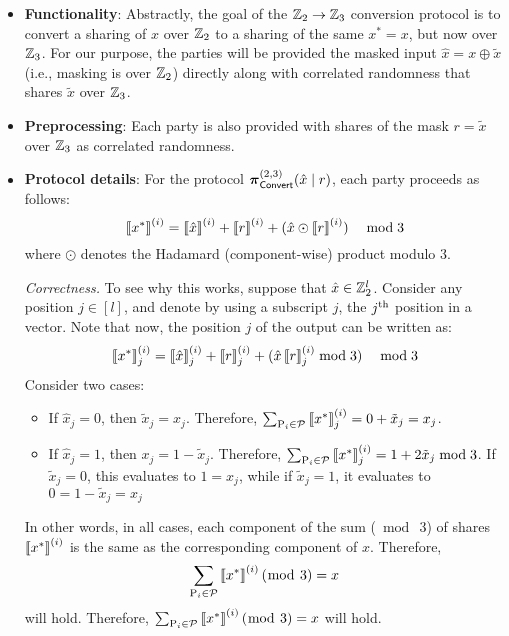 \begin{itemize}
  \item \textbf{Functionality}: Abstractly, the goal of the $\mathbb{Z}_2 \to \mathbb{Z}_3$ conversion protocol is to convert a sharing of $x$ over $\mathbb{Z}_2$ to a sharing of the same $x^* = x$, but now over $\mathbb{Z}_3$. For our purpose, the parties will be provided the masked input $\hat{x} = x \oplus \tilde{x}$ (i.e., masking is over $\mathbb{Z}_2$) directly along with correlated randomness that shares $\tilde{x}$ over $\mathbb{Z}_3$.

  \item \textbf{Preprocessing}: Each party is also provided with shares of the mask $r = \tilde{x}$ over $\mathbb{Z}_3$ as correlated randomness.

  \item \textbf{Protocol details}: For the protocol $\boldsymbol{\pi}_{\textnormal{\textsf{Convert}}}^{(2,3)}(\hat{x} \mid r)$, each party proceeds as follows:
  \[
  \left\llbracket x^* \right\rrbracket^{(i)} = \left\llbracket \hat{x} \right\rrbracket^{(i)} + \left\llbracket r \right\rrbracket^{(i)} + (\hat{x} \odot \left\llbracket r \right\rrbracket^{(i)}) \quad \bmod 3
  \]
where $\odot$ denotes the Hadamard (component-wise) product modulo 3.
\iffull

\noindent \textit{Correctness.} To see why this works, suppose that $\hat{x} \in \mathbb{Z}_2^l$. Consider any position $j \in [l]$, and denote by using a subscript $j$, the $j^{\textnormal{th}}$ position in a vector. Note that now, the position $j$ of the output can be written as:
\[
    \left\llbracket x^* \right\rrbracket^{(i)}_j = \left\llbracket \hat{x} \right\rrbracket^{(i)}_j + \left\llbracket r \right\rrbracket^{(i)}_j + (\hat{x}\left\llbracket r \right\rrbracket^{(i)}_j\bmod 3) \quad \bmod 3
\]
Consider two cases:
\begin{itemize}
\item If $\hat{x}_j = 0$, then $\tilde{x}_j = x_j$. Therefore, $\sum_{\textnormal{P}_i \in \mathcal{P}} \left\llbracket x^* \right\rrbracket^{(i)}_j = 0 + \tilde{x}_j = x_j$.

\item If $\hat{x}_j = 1$, then $x_j = 1 - \tilde{x}_j$. Therefore, $\sum_{\textnormal{P}_i \in \mathcal{P}} \left\llbracket x^* \right\rrbracket^{(i)}_j = 1 + 2\tilde{x}_j \bmod 3$. If $\tilde{x}_j = 0$, this evaluates to $1 = x_j$, while if $\tilde{x}_j = 1$, it evaluates to $0 = 1 - \tilde{x}_j = x_j$
\end{itemize}
In other words, in all cases, each component of the sum ($\bmod~3$) of shares $\left\llbracket x^* \right\rrbracket^{(i)}$ is the same as the corresponding component of $x$.
Therefore,
\[
\sum_{\textnormal{P}_i \in \mathcal{P}} \left\llbracket x^* \right\rrbracket^{(i)} (\bmod~3) = x
\]
will hold.
Therefore, $\sum_{\textnormal{P}_i \in \mathcal{P}} \left\llbracket x^* \right\rrbracket^{(i)} (\bmod~3) = x$ will hold.
\fi
\end{itemize}


